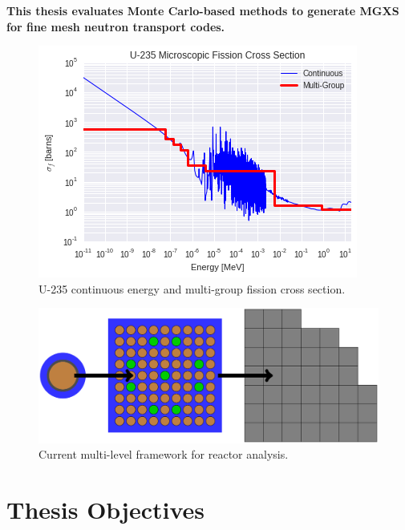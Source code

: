\begin{emphbox}
\textbf{This thesis evaluates Monte Carlo-based methods to generate \ac{MGXS} for fine mesh neutron transport codes.}
\end{emphbox}

\begin{figure}
\centering
\includegraphics[width=0.9\linewidth]{figures/intro/u235-ce-mg-xs}
\caption[U-235 continuous energy and multi-group fission cross section]{U-235 continuous energy and multi-group fission cross section.}
\label{fig:chap1-multi-level-flow-chart}
\end{figure}

\begin{figure}
\centering
\includegraphics[width=0.9\linewidth]{figures/intro/multi-step-flow-chart}
\caption[Multi-level approach to reactor analysis]{Current multi-level framework for reactor analysis.}
\label{fig:chap1-multi-level-flow-chart}
\end{figure}


\section{Thesis Objectives}
\label{sec:chap1-objectives}

